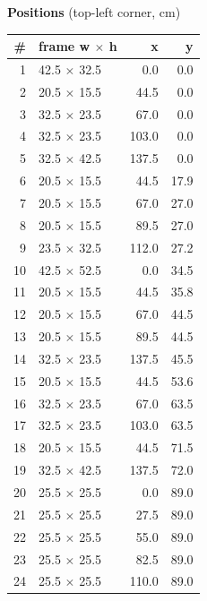 \documentclass[a4paper,landscape,10pt]{article}
\begin{document}
\begin{minipage}[t]{0.25\textwidth}
\vspace{8pt}
{\bfseries Positions} (top-left corner, cm)\\[2pt]
\tiny
\begin{tabular}{@{}r l r r@{}}
\toprule
\# & frame w $\times$ h & x & y \\
\midrule
1 & 42.5 $\times$ 32.5 & 0.0 & 0.0 \\
2 & 20.5 $\times$ 15.5 & 44.5 & 0.0 \\
3 & 32.5 $\times$ 23.5 & 67.0 & 0.0 \\
4 & 32.5 $\times$ 23.5 & 103.0 & 0.0 \\
5 & 32.5 $\times$ 42.5 & 137.5 & 0.0 \\
6 & 20.5 $\times$ 15.5 & 44.5 & 17.9 \\
7 & 20.5 $\times$ 15.5 & 67.0 & 27.0 \\
8 & 20.5 $\times$ 15.5 & 89.5 & 27.0 \\
9 & 23.5 $\times$ 32.5 & 112.0 & 27.2 \\
10 & 42.5 $\times$ 52.5 & 0.0 & 34.5 \\
11 & 20.5 $\times$ 15.5 & 44.5 & 35.8 \\
12 & 20.5 $\times$ 15.5 & 67.0 & 44.5 \\
13 & 20.5 $\times$ 15.5 & 89.5 & 44.5 \\
14 & 32.5 $\times$ 23.5 & 137.5 & 45.5 \\
15 & 20.5 $\times$ 15.5 & 44.5 & 53.6 \\
16 & 32.5 $\times$ 23.5 & 67.0 & 63.5 \\
17 & 32.5 $\times$ 23.5 & 103.0 & 63.5 \\
18 & 20.5 $\times$ 15.5 & 44.5 & 71.5 \\
19 & 32.5 $\times$ 42.5 & 137.5 & 72.0 \\
20 & 25.5 $\times$ 25.5 & 0.0 & 89.0 \\
21 & 25.5 $\times$ 25.5 & 27.5 & 89.0 \\
22 & 25.5 $\times$ 25.5 & 55.0 & 89.0 \\
23 & 25.5 $\times$ 25.5 & 82.5 & 89.0 \\
24 & 25.5 $\times$ 25.5 & 110.0 & 89.0 \\
\bottomrule
\end{tabular}
\end{minipage}
\clearpage
\end{document}
